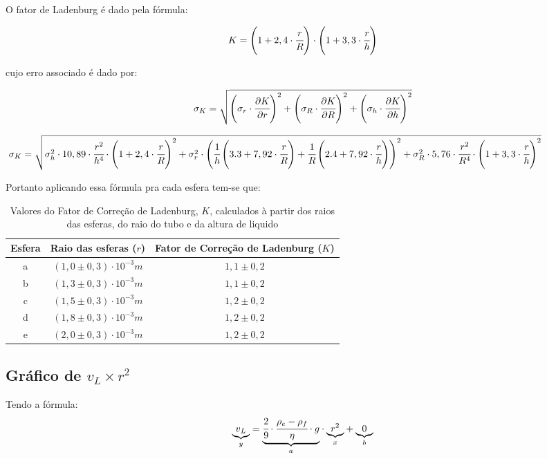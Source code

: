 \documentclass[english,brazil]{article}
\providecommand{\tabularnewline}{\\}
\begin{document}
			O fator de Ladenburg é dado pela fórmula:

			\begin{equation}
				K=\left(1+2,4\cdot\cfrac{r}{R}\right)\cdot\left(1+3,3\cdot\cfrac{r}{h}\right)
			\end{equation}

			cujo erro associado é dado por:

			$$\sigma_{K}=\sqrt{\left(\sigma_{r}\cdot\cfrac{\partial K}{\partial r}\right)^{2}+\left(\sigma_{R}\cdot\cfrac{\partial K}{\partial R}\right)^{2}+\left(\sigma_{h}\cdot\cfrac{\partial K}{\partial h}\right)^{2}}$$

			\begin{equation}
				\hspace{-2cm}\sigma_{K}=\sqrt{\sigma_{h}^{2}\cdot10,89\cdot\cfrac{r^{2}}{h^{4}}\cdot\left(1+2,4\cdot\cfrac{r}{R}\right)^{2}+\sigma_{r}^{2}\cdot\left(\cfrac{1}{h}\left(3.3+7,92\cdot\cfrac{r}{R}\right)+\cfrac{1}{R}\left(2.4+7,92\cdot\cfrac{r}{h}\right)\right)^{2}+\sigma_{R}^{2}\cdot5,76\cdot\cfrac{r^{2}}{R^{4}}\cdot\left(1+3,3\cdot\cfrac{r}{h}\right)^{2}}
			\end{equation}
			

			Portanto aplicando essa fórmula pra cada esfera tem-se que:

			\begin{table}[H]
				\caption{Valores do Fator de Correção de Ladenburg, $K$, calculados à partir dos raios das esferas, do raio do tubo e da altura de liquido}
				\centering{}%
				\begin{tabular}{|c|c|c|}
					\hline 
					Esfera  & Raio das esferas ($r$)  & Fator de Correção de Ladenburg ($K$)\tabularnewline
					\hline 
					a  & $(1,0\pm0,3)\cdot10^{-3}\unit{m}$  & $1,1\pm0,2$\tabularnewline
					\hline 
					b  & $(1,3\pm0,3)\cdot10^{-3}\unit{m}$  & $1,1\pm0,2$\tabularnewline
					\hline 
					c  & $(1,5\pm0,3)\cdot10^{-3}\unit{m}$  & $1,2\pm0,2$\tabularnewline
					\hline 
					d  & $(1,8\pm0,3)\cdot10^{-3}\unit{m}$  & $1,2\pm0,2$\tabularnewline
					\hline 
					e  & $(2,0\pm0,3)\cdot10^{-3}\unit{m}$  & $1,2\pm0,2$\tabularnewline
					\hline 
				\end{tabular}
			\end{table}

		\subsection{Gráfico de $v_{L}\times r^{2}$}

			Tendo a fórmula:
			\begin{equation}
				\underset{y}{\underbrace{v{}_{L}}}=\underset{a}{\underbrace{\cfrac{2}{9}\cdot\cfrac{\rho_{e}-\rho_{f}}{\eta}\cdot g}}\cdot\underset{x}{\underbrace{r^{2}}}+\underset{b}{\underbrace{0}}
			\end{equation}
\end{document}
